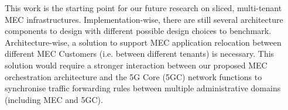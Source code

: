 This work is the starting point for our future research on sliced, multi-tenant MEC infrastructures. Implementation-wise, there are still several architecture components to design with different possible design choices to benchmark. Architecture-wise, a solution to support MEC application relocation between different MEC Customers (i.e. between different tenants) is necessary. This solution would require a stronger interaction between our proposed MEC orchestration architecture and the 5G Core (5GC) network functions to synchronise traffic forwarding rules between multiple administrative domains (including MEC and 5GC). 
%
\vspace{-0.2cm}
%
%
